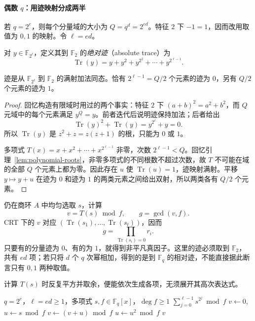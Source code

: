 \documentclass[lang=cn,a4paper,fontset=none,zihao=false,10pt,openany,twoside]{beautybook}
\numberwithin{algorithm}{chapter}
\begin{document}
\paragraph{偶数 $q$：用迹映射分成两半}
若 $q=2^e$，则每个分量域的大小为 $Q=q^d=2^{ed}$。特征 $2$ 下 $-1=1$，因而改用取值为 $0,1$ 的映射。令 $\ell=ed$。
\begin{definition}[到 $\mathbb F_2$ 的迹]
对 $y\in\mathbb F_{2^\ell}$，定义其到 $\mathbb F_2$ 的\emph{绝对迹}（absolute trace）为
\[
 \operatorname{Tr}(y)=y+y^2+y^{2^2}+\cdots+y^{2^{\ell-1}}.
\]
\end{definition}
\begin{lemma}[迹的两个取值等量]\label{lem:trace-halves}
迹是从 $\mathbb F_{2^\ell}$ 到 $\mathbb F_2$ 的满射加法同态。恰有 $2^{\ell-1}=Q/2$ 个元素的迹为 $0$，另有 $Q/2$ 个元素的迹为 $1$。
\end{lemma}
\begin{proof}
回忆构造有限域时用过的两个事实：特征 $2$ 下 $(a+b)^2=a^2+b^2$，而 $Q$ 元域中的每个元素满足 $y^Q=y$。前者迭代后说明迹保持加法；后者给出
\[
 \operatorname{Tr}(y)^2+\operatorname{Tr}(y)=y^{2^\ell}+y=0.
\]
所以 $\operatorname{Tr}(y)$ 是 $z^2+z=z(z+1)$ 的根，只能为 $0$ 或 $1$。

多项式 $T(x)=x+x^2+\cdots+x^{2^{\ell-1}}$ 非零，次数 $2^{\ell-1}<Q$。回忆引理~\ref{lem:polynomial-roots}，非零多项式的不同根数不超过次数，故 $T$ 不可能在域的全部 $Q$ 个元素上都为零。因此存在 $u$ 使 $\operatorname{Tr}(u)=1$，迹映射满射。平移 $y\mapsto y+u$ 在迹为 $0$ 和迹为 $1$ 的两类元素之间给出双射，所以两类各有 $Q/2$ 个元素。
\end{proof}

仍在商环 $A$ 中均匀选取 $s$，计算
\[
 v=T(s)\bmod f,\qquad
 g=\gcd(v,f).
\]
CRT 下的 $v$ 对应 $(\operatorname{Tr}(s_1),\ldots,\operatorname{Tr}(s_t))$，因而
\[
 g=\prod_{\operatorname{Tr}(s_i)=0}r_i.
\]
只要有的分量迹为 $0$、有的为 $1$，就得到非平凡真因子。这里的迹必须取到 $\mathbb F_2$，共有 $ed$ 项；若只将 $d$ 个 $q$ 次幂相加，得到的是到 $\mathbb F_q$ 的相对迹，不能直接据此断言只有 $0,1$ 两种取值。

计算 $T(s)$ 时反复平方并取余，便能依次生成各项，无须展开其高次表达式。
\begin{algorithm}[htbp]
\caption{特征 $2$ 下的模迹计算}\label{alg:trace-mod}
\begin{algorithmic}[1]
\Require $q=2^e$，$\ell=ed\ge1$，多项式 $s,f\in\mathbb F_q[x]$，$\deg f\ge1$
\Ensure $\sum_{j=0}^{\ell-1}s^{2^j}\bmod f$
 \State $v\gets0$, $u\gets s\bmod f$
  \State $v\gets(v+u)\bmod f$
  \State $u\gets u^2\bmod f$
 \EndFor
 \State \Return $v$
\EndFunction
\end{algorithmic}
\end{algorithm}
\end{document}
